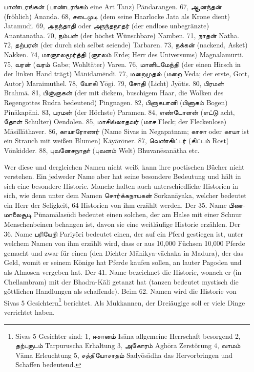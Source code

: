 \documentclass{article}
\newcommand{\TamilText}[1]{\texttamil{#1}}
\newcommand{\tam}[1]{\TamilText{#1}}
\begin{document}
\tam{பாண்டரங்கன்} (\tam{பாண்டரங்கம்} eine Art Tanz) P\={a}ndarangen. 67, \tam{ஆனந்தன்} (fröhlich) \={A}nanda. 68, \tam{சடைமுடி} (dem seine Haarlocke Jata als Krone dient) Jatamudi. 69, \tam{அநந்தாதி} oder \tam{அநந்தநாதர்} (der endlose unbegränzte) Anantan\={a}tha. 70, \tam{நம்பன்} (der höchst Wünschbare) Namben. 71, \tam{நாதன்} N\={a}tha. 72, \tam{தற்பரன்} (der durch sich selbst seiende) Tarbaren. 73, \tam{நக்கன்} (nackend, Asket) Nakken. 74, \tam{மாஞாலமூர்த்தி} (\tam{ஞாலம்} Erde; Herr des Universums) M\={a}gn\={a}lam\={u}rti. 75, \tam{வரன்} (\tam{வரம்} Gabe; Wohltäter) Varen. 76, \tam{மானிடமேந்தி} (der einen Hirsch in der linken Hand trägt) M\={a}nidam\={e}ndi. 77, \tam{மறைமுதல்} (\tam{மறை} Veda; der erste, Gott, Autor) Maraimuthel. 78, \tam{யோகி} Y\={o}gi. 79, \tam{சோதி} (Licht) Jy\={o}tis. 80, \tam{பிரமன்} Brahm\={a}. 81, \tam{பிஞ்ஞகன்} (der mit dickem, buschigem Haar, die Wolken des Regengottes Rudra bedeutend) Pingnagen. 82, \tam{பினாகபானி} (\tam{பினாகம்} Bogen) Pin\={a}kap\={a}ni. 83, \tam{பரமன்} (der Höchste) Paramen. 84, \tam{எண்டோளன்} (\tam{எட்டு} acht, \tam{தோள்} Schulter) Oend\={o}len. 85, \tam{மாசில்லாதவர்} (\tam{மாச} Fleck; der Fleckenlose) M\={a}sill\={a}thaver. 86, \tam{காயாரோணர்} (Name Sivas in Negapatnam; \tam{காசா} oder \tam{காயா} ist ein Strauch mit weißen Blumen) K\={a}y\={a}r\={o}ner. 87, \tam{வெண்கிட்டர்} (\tam{கிட்டம்} Rost) Vönkidder. 88, \tam{புவனேசநாதா்} (\tam{புவனம்} Welt) Bhuvan\={e}san\={a}tha etc.

Wer diese und dergleichen Namen nicht weiß, kann ihre poetischen Bücher nicht verstehen. Ein jedweder Name aber hat seine besondere Bedeutung und hält in sich eine besondere Historie. Manche halten auch unterschiedliche Historien in sich, wie denn unter dem Namen \tam{சொர்க்கநாயகன்} Sorkan\={a}yaka, welcher bedeutet ein Herr der Seligkeit, 64 Historien von ihm erzählt werden. Der 35. Name \tam{பிணமாலைசூடி} Pünam\={a}las\={u}di bedeutet einen solchen, der am Halse mit einer Schnur Menschenbeinen behangen ist, davon sie eine weitläufige Historie erzählen. Der 36. Name \tam{பரியேறி} Pariyöri bedeutet einen, der auf ein Pferd gestiegen ist, unter welchem Namen von ihm erzählt wird, dass er aus 10,000 Füchsen 10,000 Pferde gemacht und zwar für einen (den Dichter M\={a}nikya-v\={a}chaka in Madura), der das Geld, womit er seinem Könige hat Pferde kaufen sollen, an lauter Pagoden und als Almosen vergeben hat. Der 41. Name bezeichnet die Historie, wonach er (in Chellambram) mit der Bhadra-K\={a}li getanzt hat (tanzen bedeutet mystisch die göttlichen Handlungen als schaffende). Beim 62. Namen wird die Historie von Sivas 5 Gesichtern\footnote{Sivas 5 Gesichter sind: 1, \tam{ஈசானம்} Is\={a}na allgemeine Herrschaft besorgend 2, \tam{தற்புருடம்} Tarpuruscha Erhaltung 3, \tam{அகோரம்} Agh\={o}ra Zerstörung 4, \tam{வாமம்} V\={a}ma Erleuchtung 5, \tam{சத்தியோசாதம்} Sady\={o}s\={a}dha das Hervorbringen und Schaffen bedeutend.} berichtet. Als Mukkannen, der Dreiäugige soll er viele Dinge verrichtet haben.
\end{document}
